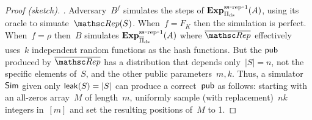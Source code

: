 \begin{proof}[Proof (sketch). ] 
Adversary~$B^{f}$ simulates the steps of $\mathrm{\mathbf{Exp}}^{\mathrm{ss\mbox{-}rep\mbox{-}1}}_{\Pi_{\mathrm{ds}}}(A)$, using its oracle to simuate~$\Rep(S)$.  When~$f=F_K$ then the simulation is perfect.  When~$f=\rho$ then~$B$ simulates $\mathrm{\mathbf{Exp}}^{\mathrm{ss\mbox{-}rep\mbox{-}1}}_{\overline{\Pi}_{\mathrm{ds}}}(A)$ where $\overline{\Rep}$ effectively uses~$k$ independent random functions as the hash functions.  But the ${\sf pub}$ produced by $\overline{\Rep}$ has a distribution that depends only~$|S|=n$, not the specific elements of~$S$, and the other public parameters~$m,k$.  Thus, a simulator~${\sf Sim}$ given only ${\sf leak}(S)=|S|$ can produce a correct~${\sf pub}$ as follows: starting with an all-zeros array~$M$ of length~$m$, uniformly sample (with replacement)~$nk$ integers in~$[m]$ and set the resulting positions of~$M$ to 1.
\end{proof}

%




